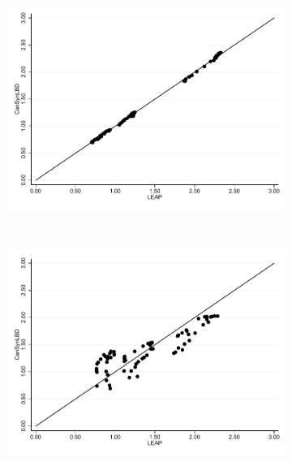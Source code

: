 \begin{figure}[H]
\centering
\begin{subfigure}[h]{0.5\linewidth}
\includegraphics[trim=0 10 0 0,clip, width=\linewidth]{graphs/Share_of_firms_by_NAICS_two-digit_and_year_Manufacturing_bw.pdf}
\end{subfigure}\\
\begin{subfigure}[h]{0.5\linewidth}
\includegraphics[trim=0 10 0 -20,clip,width=\linewidth]{graphs/Share_of_employment_by_NAICS_two-digit_and_year_Manufacturing_bw.pdf}
\end{subfigure}\\
\begin{subfigure}[h]{0.5\linewidth}

\end{subfigure}
\end{figure}
